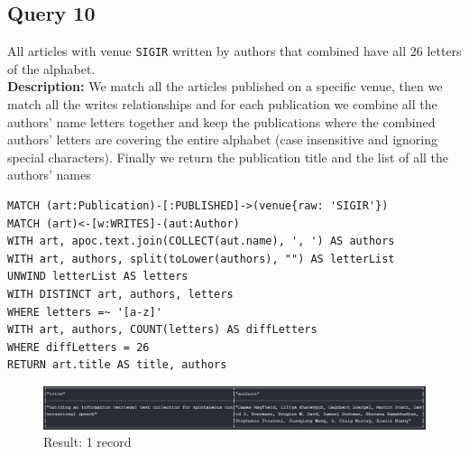 \documentclass{Configuration_Files/PoliMi3i_thesis}
\begin{document}
\subsection{Query 10}
All articles with venue \verb |SIGIR| written by authors that combined have all 26 letters of the alphabet.\\
\textbf{Description:} We match all the articles published on a specific venue, then we match all the writes relationships
and for each publication we combine all the authors' name letters together and keep the publications where the combined
authors' letters are covering the entire alphabet (case insensitive and ignoring special characters). Finally we return
the publication title and the list of all the authors' names
\begin{lstlisting}[language=cypher, label=lst:cypher-example]
MATCH (art:Publication)-[:PUBLISHED]->(venue{raw: 'SIGIR'})
MATCH (art)<-[w:WRITES]-(aut:Author)
WITH art, apoc.text.join(COLLECT(aut.name), ', ') AS authors
WITH art, authors, split(toLower(authors), "") AS letterList
UNWIND letterList AS letters
WITH DISTINCT art, authors, letters
WHERE letters =~ '[a-z]'
WITH art, authors, COUNT(letters) AS diffLetters
WHERE diffLetters = 26
RETURN art.title AS title, authors
\end{lstlisting}
\begin{figure}[H]
\centering
\includegraphics[width=1\textwidth]{query/query10.PNG}
\caption{Result: 1 record}
\label{fig:query10}
\end{figure}
\end{document}
